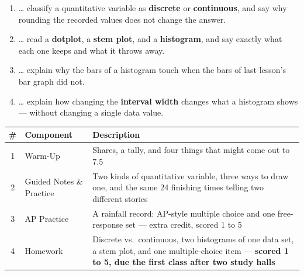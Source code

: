\documentclass[12pt]{article}
\begin{document}

\namedateperiod
\vspace{0.18in}

\boxguard[14]
\begin{learningtargetbox}
\small
\begin{enumerate}[leftmargin=1.5em, itemsep=5pt]
  \item \ldots{} classify a quantitative variable as \textbf{discrete} or \textbf{continuous},
        and say why rounding the recorded values does not change the answer.
  \item \ldots{} read a \textbf{dotplot}, a \textbf{stem plot}, and a \textbf{histogram}, and
        say exactly what each one keeps and what it throws away.
  \item \ldots{} explain why the bars of a histogram touch when the bars of last lesson's bar
        graph did not.
  \item \ldots{} explain how changing the \textbf{interval width} changes what a histogram
        shows --- without changing a single data value.
\end{enumerate}
\end{learningtargetbox}

\vspace{0.14in}

\boxguard[14]
\begin{tocbox}
\small
\renewcommand{\arraystretch}{1.5}
\begin{tabularx}{\linewidth}{@{} c l X @{}}
\rowcolor{sky}
\textbf{\#} & \textbf{Component} & \textbf{Description} \\
\midrule
1 & Warm-Up & Shares, a tally, and four things that might come out to 7.5 \\
2 & Guided Notes \& Practice & Two kinds of quantitative variable, three ways to draw one, and
                 the same 24 finishing times telling two different stories \\
3 & AP Practice & A rainfall record: AP-style multiple choice and one free-response set ---
                 extra credit, scored 1 to 5 \\
4 & Homework & Discrete vs.\ continuous, two histograms of one data set, a stem plot, and
                 one multiple-choice item --- \textbf{scored 1 to 5, due the first class after two study halls} \\
\end{tabularx}
\end{tocbox}
\end{document}
